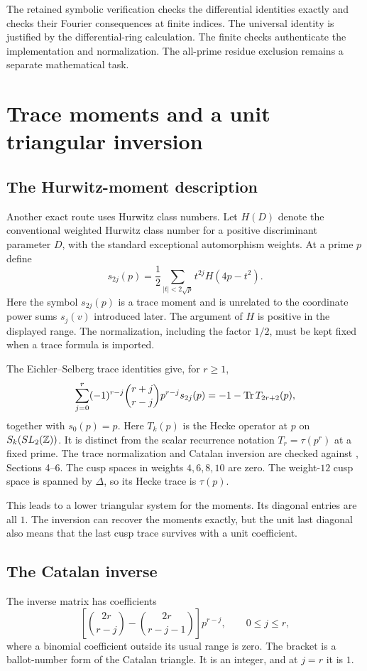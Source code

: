 The retained symbolic verification checks the differential identities exactly and checks their Fourier consequences at finite indices. The universal identity is justified by the differential-ring calculation. The finite checks authenticate the implementation and normalization. The all-prime residue exclusion remains a separate mathematical task.

\chapter{Trace moments and a unit triangular inversion}\label{ch:trace}
\section{The Hurwitz-moment description}
Another exact route uses Hurwitz class numbers. Let $H(D)$ denote the conventional weighted Hurwitz class number for a positive discriminant parameter $D$, with the standard exceptional automorphism weights. At a prime $p$ define
\begin{equation}
s_{2j}(p)=\frac12\sum_{|t|<2\sqrt p}t^{2j}H(4p-t^2).
\end{equation}
Here the symbol $s_{2j}(p)$ is a trace moment and is unrelated to the coordinate power sums $s_j(v)$ introduced later. The argument of $H$ is positive in the displayed range. The normalization, including the factor $1/2$, must be kept fixed when a trace formula is imported.

The Eichler--Selberg trace identities give, for $r\ge1$,
\begin{equation}\label{eq:traceidentity}
\sum_{j=0}^r(-1)^{r-j}\binom{r+j}{r-j}p^{r-j}s_{2j}(p)
=-1-\operatorname{Tr} T_{2r+2}(p),
\end{equation}
together with $s_0(p)=p$. Here $T_k(p)$ is the Hecke operator at $p$ on $S_k(SL_2(\mathbb Z))$. It is distinct from the scalar recurrence notation $T_r=\tau(p^r)$ at a fixed prime. The trace normalization and Catalan inversion are checked against \cite{LRTrace}, Sections 4--6. The cusp spaces in weights $4,6,8,10$ are zero. The weight-$12$ cusp space is spanned by $\Delta$, so its Hecke trace is $\tau(p)$.

This leads to a lower triangular system for the moments. Its diagonal entries are all $1$. The inversion can recover the moments exactly, but the unit last diagonal also means that the last cusp trace survives with a unit coefficient.

\section{The Catalan inverse}
The inverse matrix has coefficients
\begin{equation}\label{eq:catalan}
\left[\binom{2r}{r-j}-\binom{2r}{r-j-1}\right]p^{r-j},
\qquad0\le j\le r,
\end{equation}
where a binomial coefficient outside its usual range is zero. The bracket is a ballot-number form of the Catalan triangle. It is an integer, and at $j=r$ it is $1$.

